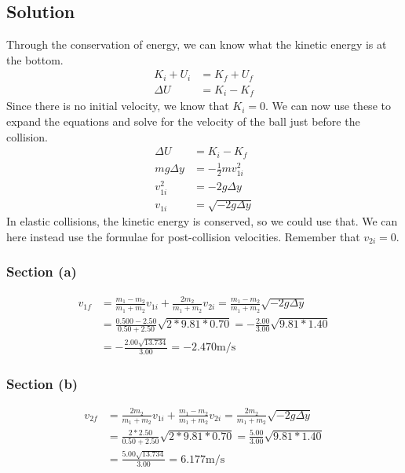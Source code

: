 \documentclass[12pt]{article}
\begin{document}
\subsection*{Solution}
Through the conservation of energy, we can know what the kinetic energy is at the bottom.
\begin{align*}
    K_i + U_i &= K_f + U_f\\
    \Delta U &= K_i - K_f
\end{align*}
Since there is no initial velocity, we know that $K_i = 0$. We can now use these to expand the equations and solve for the velocity  of the ball just before the collision.
\begin{align*}
    \Delta U &= K_i - K_f\\
    mg\Delta y  &=  -\frac{1}{2}mv_{1i}^2\\
    v_{1i}^2 &=  -2g\Delta y\\
    v_{1i}   &=  \sqrt{-2g\Delta y}
\end{align*}
In elastic collisions, the kinetic energy is conserved, so we could use that. We can here instead use the formulae for post-collision velocities. Remember that $v_{2i} = 0$.

\subsubsection*{Section (a)}
\begin{align*}
    v_{1f}  &=  \frac{m_1 - m_2}{m_1 + m_2}v_{1i} + \frac{2 m_2}{m_1 + m_2}v_{2i}
        =   \frac{m_1 - m_2}{m_1 + m_2}\sqrt{-2g\Delta y}\\
        &=  \frac{0.500 - 2.50}{0.50 + 2.50}\sqrt{2*9.81*0.70}
        =   -\frac{2.00}{3.00}\sqrt{9.81*1.40}\\
        &=  -\frac{2.00\sqrt{13.734}}{3.00}
        =   \boxed{-2.470\unit{\meter/\second}}
\end{align*}

\subsubsection*{Section (b)}
\begin{align*}
    v_{2f}  &=  \frac{2 m_2}{m_1 + m_2}v_{1i} + \frac{m_1 - m_2}{m_1 + m_2}v_{2i}
        =   \frac{2 m_2}{m_1 + m_2}\sqrt{-2g\Delta y}\\
        &=  \frac{2*2.50}{0.50 + 2.50}\sqrt{2*9.81*0.70}
        =   \frac{5.00}{3.00}\sqrt{9.81*1.40}\\
        &=  \frac{5.00\sqrt{13.734}}{3.00}
        =   \boxed{6.177\unit{\meter/\second}}
\end{align*}
\end{document}

